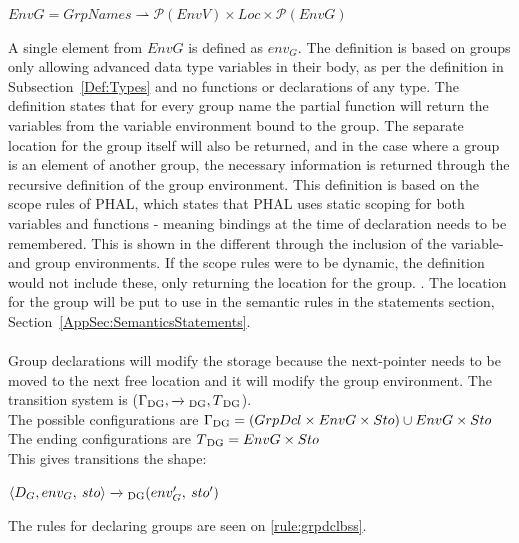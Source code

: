\begin{center}
$EnvG = GrpNames \rightharpoonup \mathcal{P}(EnvV) \times Loc \times \mathcal{P}(EnvG)$
\end{center}
A single element from $EnvG$ is defined as $env_G$. 
The definition is based on groups only allowing advanced data type variables in their body, as per the definition in Subsection~\ref{Def:Types} and no functions or declarations of any type. The definition  states that for every group name the partial function will return the variables from the variable environment bound to the group. The separate location for the group itself will also be returned, and in the case where a group is an element of another group, the necessary information is returned through the recursive definition of the group environment. This definition is based on the scope rules of PHAL, which states that PHAL uses static scoping for both variables and functions - meaning bindings at the time of declaration needs to be remembered. This is shown in the different through the inclusion of the variable- and group environments. If the scope rules were to be dynamic, the definition would not include these, only returning the location for the group. \cite{PilenVedTraeetsRod}. The location for the group will be put to use in the semantic rules in the statements section, Section~\ref{AppSec:SemanticsStatements}. 
\\\\
Group declarations will modify the storage because the next-pointer needs to be moved to the next free location and it will modify the group environment. The transition system is ($\Gamma \textsubscript{DG}, \xrightarrow{}\textsubscript{DG}, T \textsubscript{DG}$).
\\
The possible configurations are $\Gamma \textsubscript{DG} = (GrpDcl \times EnvG \times Sto) \cup EnvG \times Sto$\\
The ending configurations are
$T\textsubscript{DG} = EnvG \times Sto$\\
This gives transitions the shape: 
\\
\begin{center}
$\langle D_G, env_G, \: sto \rangle \xrightarrow{}\textsubscript{DG} (env'_G, \: sto')$
\end{center}
The rules for declaring groups are seen on \ref{rule:grpdclbss}.
